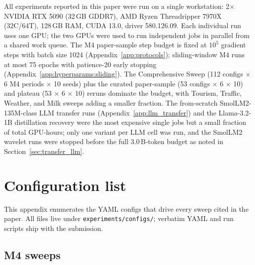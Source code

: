 \documentclass{article}
\begin{document}
All experiments reported in this paper were run on a single workstation: 2$\times$ NVIDIA RTX 5090 (32\,GB GDDR7), AMD Ryzen Threadripper 7970X (32C/64T), 128\,GB RAM, CUDA 13.0, driver 580.126.09. Each individual run uses one GPU; the two GPUs were used to run independent jobs in parallel from a shared work queue. The M4 paper-sample step budget is fixed at $10^5$ gradient steps with batch size 1024 (Appendix~\ref{app:protocols}); sliding-window M4 runs at most 75 epochs with patience-20 early stopping (Appendix~\ref{app:hyperparams:sliding}). The Comprehensive Sweep (112 configs $\times$ 6 M4 periods $\times$ 10 seeds) plus the curated paper-sample (53 configs $\times$ 6 $\times$ 10) and plateau (53 $\times$ 6 $\times$ 10) reruns dominate the budget, with Tourism, Traffic, Weather, and Milk sweeps adding a smaller fraction. The from-scratch SmolLM2-135M-class LLM transfer runs (Appendix~\ref{app:llm_transfer}) and the Llama-3.2-1B distillation recovery were the most expensive single jobs but a small fraction of total GPU-hours; only one variant per LLM cell was run, and the SmolLM2 wavelet runs were stopped before the full 3.0\,B-token budget as noted in Section~\ref{sec:transfer_llm}.

\section{Configuration list}
\label{app:configs}

This appendix enumerates the YAML configs that drive every sweep cited in the paper. All files live under \texttt{experiments/configs/}; verbatim YAML and run scripts ship with the submission.

\subsection{M4 sweeps}
\label{app:configs:m4}
\end{document}
